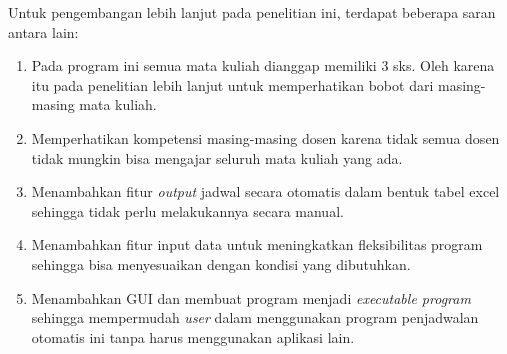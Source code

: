 Untuk pengembangan lebih lanjut pada penelitian ini, terdapat beberapa saran antara lain:

\begin{enumerate}[nolistsep]
  \item Pada program ini semua mata kuliah dianggap memiliki 3 sks. Oleh karena itu pada penelitian lebih lanjut untuk memperhatikan bobot dari masing-masing mata kuliah.
  \item Memperhatikan kompetensi masing-masing dosen karena tidak semua dosen tidak \linebreak mungkin bisa mengajar seluruh mata kuliah yang ada.
  \item Menambahkan fitur \emph{output} jadwal secara otomatis dalam bentuk tabel excel sehingga tidak perlu melakukannya secara manual.
  \item Menambahkan fitur input data untuk meningkatkan fleksibilitas program sehingga bisa menyesuaikan dengan kondisi yang dibutuhkan.
  \item Menambahkan GUI dan membuat program menjadi \emph{executable program} sehingga \linebreak mempermudah \emph{user} dalam menggunakan program penjadwalan otomatis ini tanpa harus menggunakan aplikasi lain.
\end{enumerate}
